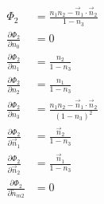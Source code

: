 \documentclass[double,12pt]{revtex4-2}
\begin{document}
\begin{align}
  \Phi_2 &= \frac{n_1n_2-\vec n_1\cdot\vec n_2}{1-n_3}          \\
  \frac{\partial \Phi_2}{\partial n_0} &=  0                    \\
  \frac{\partial \Phi_2}{\partial n_1} &=  \frac{n_2}{1-n_3}    \\
  \frac{\partial \Phi_2}{\partial n_2} &=  \frac{n_1}{1-n_3}    \\
  \frac{\partial \Phi_2}{\partial n_3} &=   \frac{n_1n_2-\vec n_1\cdot\vec n_2}{\left(1-n_3\right)^2} \\
  \frac{\partial \Phi_2}{\partial \vec n_1} &=   \frac{\vec n_2}{1-n_3}  \\
  \frac{\partial \Phi_2}{\partial \vec n_2} &=   \frac{\vec n_1}{1-n_3}  \\
  \frac{\partial \Phi_2}{\partial \overleftrightarrow  n_{m2}} &= 0      \\
\end{align} 
\end{document}
